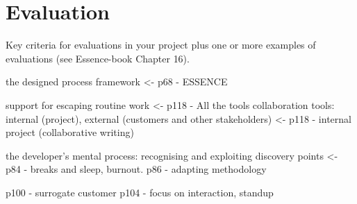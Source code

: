 \section{Evaluation}
Key criteria for evaluations in your project plus one or more examples of evaluations  (see Essence-book Chapter 16).



the designed process framework <- p68 - ESSENCE

support for escaping routine work <- p118 - All the tools
collaboration tools: internal (project), external (customers and other stakeholders) <- p118 - internal project (collaborative writing)





the developer’s mental process: recognising and exploiting discovery points <- p84 - breaks and sleep, burnout. p86 - adapting methodology



p100 - surrogate customer
p104 - focus  on  interaction, standup
